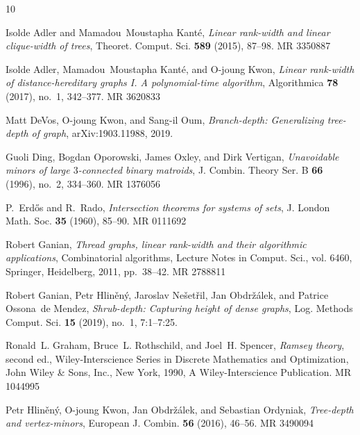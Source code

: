\documentclass[11pt]{article}
\begin{document}
	\providecommand{\bysame}{\leavevmode\hbox to3em{\hrulefill}\thinspace}
\providecommand{\MR}{\relax\ifhmode\unskip\space\fi MR }
\providecommand{\MRhref}[2]{%
  \href{http://www.ams.org/mathscinet-getitem?mr=#1}{#2}
}
\providecommand{\href}[2]{#2}
\begin{thebibliography}{10}

Isolde Adler and Mamadou~Moustapha Kant\'{e}, \emph{Linear rank-width and
  linear clique-width of trees}, Theoret. Comput. Sci. \textbf{589} (2015),
  87--98. \MR{3350887}

Isolde Adler, Mamadou~Moustapha Kant\'{e}, and O{-}joung Kwon, \emph{Linear
  rank-width of distance-hereditary graphs {I}. {A} polynomial-time algorithm},
  Algorithmica \textbf{78} (2017), no.~1, 342--377. \MR{3620833}

Matt DeVos, O{-}joung Kwon, and Sang{-}il Oum, \emph{Branch-depth:
  {G}eneralizing tree-depth of graph}, arXiv:1903.11988, 2019.

Guoli Ding, Bogdan Oporowski, James Oxley, and Dirk Vertigan, \emph{Unavoidable
  minors of large {$3$}-connected binary matroids}, J. Combin. Theory Ser. B
  \textbf{66} (1996), no.~2, 334--360. \MR{1376056}

P.~Erd\H{o}s and R.~Rado, \emph{Intersection theorems for systems of sets}, J.
  London Math. Soc. \textbf{35} (1960), 85--90. \MR{0111692}

Robert Ganian, \emph{Thread graphs, linear rank-width and their algorithmic
  applications}, Combinatorial algorithms, Lecture Notes in Comput. Sci., vol.
  6460, Springer, Heidelberg, 2011, pp.~38--42. \MR{2788811}

Robert Ganian, Petr Hlin{\v{e}}n{{\'y}}, Jaroslav Ne{\v{s}}et{\v{r}}il, Jan
  Obdr\v{z}\'{a}lek, and Patrice Ossona~de Mendez, \emph{Shrub-depth: Capturing
  height of dense graphs}, Log. Methods Comput. Sci. \textbf{15} (2019), no.~1,
  7:1--7:25.

Ronald~L. Graham, Bruce~L. Rothschild, and Joel~H. Spencer, \emph{Ramsey
  theory}, second ed., Wiley-Interscience Series in Discrete Mathematics and
  Optimization, John Wiley \& Sons, Inc., New York, 1990, A Wiley-Interscience
  Publication. \MR{1044995}

Petr Hlin{\v{e}}n{\'y}, O{-}joung Kwon, Jan Obdr{\v{z}}{\'a}lek, and Sebastian
  Ordyniak, \emph{Tree-depth and vertex-minors}, European J. Combin.
  \textbf{56} (2016), 46--56. \MR{3490094}


\end{thebibliography}
\end{document}
